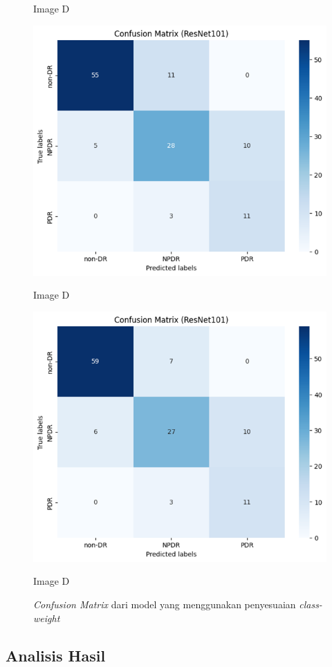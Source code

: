 \begin{figure}[H]
\begin{minipage}[t]{0.475\textwidth}
            \caption{Image D}
            \label{fig:2b}
        \end{minipage}
        \begin{minipage}[t]{0.475\textwidth} %
            \includegraphics[draft=false, width=\textwidth]{gambar/confusionMatrixResnet101class-weighted_bestTrain.png} 
            \caption{Image D}
            \label{fig:2b}
        \end{minipage}
        \begin{minipage}[t]{0.475\textwidth} %
            \includegraphics[draft=false, width=\textwidth]{gambar/confusionMatrixResnet101class-weighted_bestVal.png} 
            \caption{Image D}
            \label{fig:2b}
        \end{minipage}
        \caption{\emph{Confusion Matrix} dari model yang menggunakan penyesuaian \emph{class-weight}}
    \end{figure}

\subsection{Analisis Hasil}